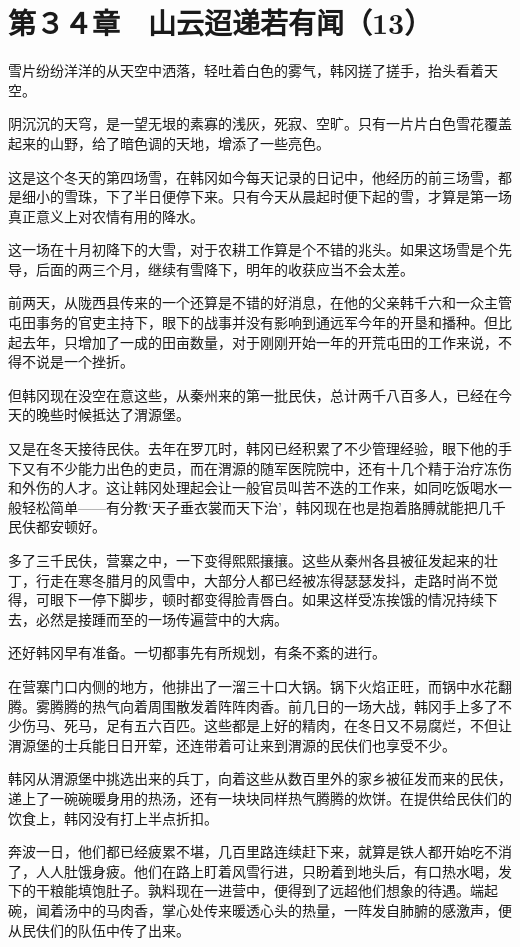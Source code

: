\section{第３４章　山云迢递若有闻（13）}

雪片纷纷洋洋的从天空中洒落，轻吐着白色的雾气，韩冈搓了搓手，抬头看着天空。

阴沉沉的天穹，是一望无垠的素寡的浅灰，死寂、空旷。只有一片片白色雪花覆盖起来的山野，给了暗色调的天地，增添了一些亮色。

这是这个冬天的第四场雪，在韩冈如今每天记录的日记中，他经历的前三场雪，都是细小的雪珠，下了半日便停下来。只有今天从晨起时便下起的雪，才算是第一场真正意义上对农情有用的降水。

这一场在十月初降下的大雪，对于农耕工作算是个不错的兆头。如果这场雪是个先导，后面的两三个月，继续有雪降下，明年的收获应当不会太差。

前两天，从陇西县传来的一个还算是不错的好消息，在他的父亲韩千六和一众主管屯田事务的官吏主持下，眼下的战事并没有影响到通远军今年的开垦和播种。但比起去年，只增加了一成的田亩数量，对于刚刚开始一年的开荒屯田的工作来说，不得不说是一个挫折。

但韩冈现在没空在意这些，从秦州来的第一批民伕，总计两千八百多人，已经在今天的晚些时候抵达了渭源堡。

又是在冬天接待民伕。去年在罗兀时，韩冈已经积累了不少管理经验，眼下他的手下又有不少能力出色的吏员，而在渭源的随军医院院中，还有十几个精于治疗冻伤和外伤的人才。这让韩冈处理起会让一般官员叫苦不迭的工作来，如同吃饭喝水一般轻松简单——有分教‘天子垂衣裳而天下治’，韩冈现在也是抱着胳膊就能把几千民伕都安顿好。

多了三千民伕，营寨之中，一下变得熙熙攘攘。这些从秦州各县被征发起来的壮丁，行走在寒冬腊月的风雪中，大部分人都已经被冻得瑟瑟发抖，走路时尚不觉得，可眼下一停下脚步，顿时都变得脸青唇白。如果这样受冻挨饿的情况持续下去，必然是接踵而至的一场传遍营中的大病。

还好韩冈早有准备。一切都事先有所规划，有条不紊的进行。

在营寨门口内侧的地方，他排出了一溜三十口大锅。锅下火焰正旺，而锅中水花翻腾。雾腾腾的热气向着周围散发着阵阵肉香。前几日的一场大战，韩冈手上多了不少伤马、死马，足有五六百匹。这些都是上好的精肉，在冬日又不易腐烂，不但让渭源堡的士兵能日日开荤，还连带着可让来到渭源的民伕们也享受不少。

韩冈从渭源堡中挑选出来的兵丁，向着这些从数百里外的家乡被征发而来的民伕，递上了一碗碗暖身用的热汤，还有一块块同样热气腾腾的炊饼。在提供给民伕们的饮食上，韩冈没有打上半点折扣。

奔波一日，他们都已经疲累不堪，几百里路连续赶下来，就算是铁人都开始吃不消了，人人肚饿身疲。他们在路上盯着风雪行进，只盼着到地头后，有口热水喝，发下的干粮能填饱肚子。孰料现在一进营中，便得到了远超他们想象的待遇。端起碗，闻着汤中的马肉香，掌心处传来暖透心头的热量，一阵发自肺腑的感激声，便从民伕们的队伍中传了出来。

